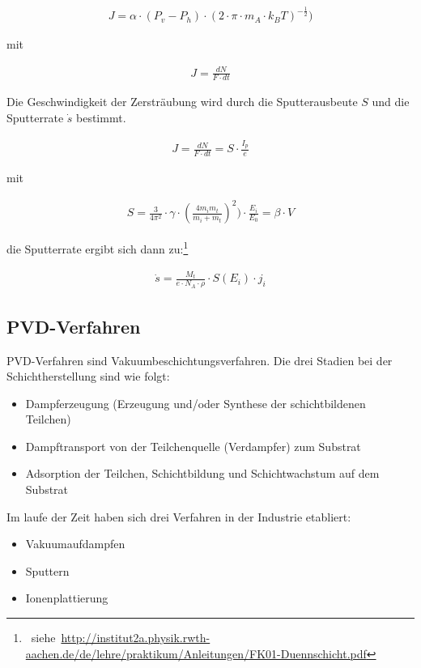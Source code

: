 \documentclass[12pt,a4paper,bibliography=totocnumbered,listof=totocnumbered,fleqn]{scrartcl}
\begin{document}
\begin{align}
J=\alpha\cdot (P_{v}-P_{h})\cdot (2\cdot \pi \cdot m_{A} \cdot k_{B} T)^{-\frac{1}{2}})
\end{align}

mit 

\begin{align}
J = \frac{dN}{F\cdot dt}
\end{align}

Die Geschwindigkeit der Zersträubung wird durch die Sputterausbeute $S$ und die Sputterrate $\dot{s}$ bestimmt.

\begin{align}
J = \frac{dN}{F\cdot dt} = S\cdot \frac{I_{p}}{e}
\end{align}

mit

\begin{align}
S = \frac{3}{4\pi^{2}}\cdot \gamma\cdot (\frac{4m_{i}m_{t}}{m_{i}+m_{t}})^{2}) \cdot \frac{E_{i}}{E_{0}} = \beta \cdot V
\end{align}

die Sputterrate ergibt sich dann zu:\footnote{~siehe~\url{http://institut2a.physik.rwth-aachen.de/de/lehre/praktikum/Anleitungen/FK01-Duennschicht.pdf}}

\begin{align}
\dot{s} = \frac{M_{t}}{e\cdot N_{A} \cdot \rho}\cdot S(E_{i})\cdot j_{i}
\end{align}

\pagebreak
\subsection{PVD-Verfahren}

PVD-Verfahren sind Vakuumbeschichtungsverfahren.
Die drei Stadien bei der Schichtherstellung sind wie folgt:

\begin{itemize}
	\item Dampferzeugung (Erzeugung und/oder Synthese der schichtbildenen Teilchen)
	\item Dampftransport von der Teilchenquelle (Verdampfer) zum Substrat
	\item Adsorption der Teilchen, Schichtbildung und Schichtwachstum auf dem Substrat
\end{itemize}

Im laufe der Zeit haben sich drei Verfahren in der Industrie etabliert:
\begin{itemize}
	\item Vakuumaufdampfen
	\item Sputtern
	\item Ionenplattierung
\end{itemize}
\end{document}
